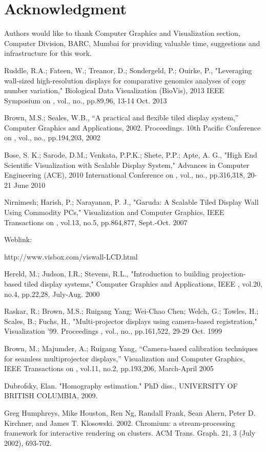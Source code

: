 \documentclass[conference]{/home/pranav/Desktop/Publication_work/latex_class_files/IEEEtran}
\begin{document}
\section*{Acknowledgment}
Authors would like to thank Computer Graphics and Visualization section, Computer Division, BARC, Mumbai for providing valuable time, suggestions and infrastructure for this work.

\begin{thebibliography}{1}
Ruddle, R.A.; Fateen, W.; Treanor, D.; Sondergeld, P.; Ouirke, P., "Leveraging wall-sized high-resolution displays for comparative genomics analyses of copy number variation," Biological Data Visualization (BioVis), 2013 IEEE Symposium on , vol., no., pp.89,96, 13-14 Oct. 2013

Brown, M.S.; Seales, W.B., ``A practical and flexible tiled display system,'' Computer Graphics and Applications, 2002. Proceedings. 10th Pacific Conference on , vol., no., pp.194,203, 2002


Bose, S. K.; Sarode, D.M.; Venkata, P.P.K.; Shete, P.P.; Apte, A. G., "High End Scientific Visualization with Scalable Display System," Advances in Computer Engineering (ACE), 2010 International Conference on , vol., no., pp.316,318, 20-21 June 2010

Nirnimesh; Harish, P.; Narayanan, P. J., "Garuda: A Scalable Tiled Display Wall Using Commodity PCs," Visualization and Computer Graphics, IEEE Transactions on , vol.13, no.5, pp.864,877, Sept.-Oct. 2007

Weblink:\par
http://www.visbox.com/viswall-LCD.html


Hereld, M.; Judson, I.R.; Stevens, R.L., "Introduction to building projection-based tiled display systems," Computer Graphics and Applications, IEEE , vol.20, no.4, pp.22,28, July-Aug. 2000

Raskar, R.; Brown, M.S.; Ruigang Yang; Wei-Chao Chen; Welch, G.; Towles, H.; Scales, B.; Fuchs, H., "Multi-projector displays using camera-based registration," Visualization '99. Proceedings , vol., no., pp.161,522, 29-29 Oct. 1999

Brown, M.; Majumder, A.; Ruigang Yang, ``Camera-based calibration techniques for seamless multiprojector displays,'' Visualization and Computer Graphics, IEEE Transactions on , vol.11, no.2, pp.193,206, March-April 2005


Dubrofsky, Elan. "Homography estimation." PhD diss., UNIVERSITY OF BRITISH COLUMBIA, 2009.

Greg Humphreys, Mike Houston, Ren Ng, Randall Frank, Sean Ahern, Peter D. Kirchner, and James T. Klosowski. 2002. Chromium: a stream-processing framework for interactive rendering on clusters. ACM Trans. Graph. 21, 3 (July 2002), 693-702. 



\end{thebibliography}
\end{document}
